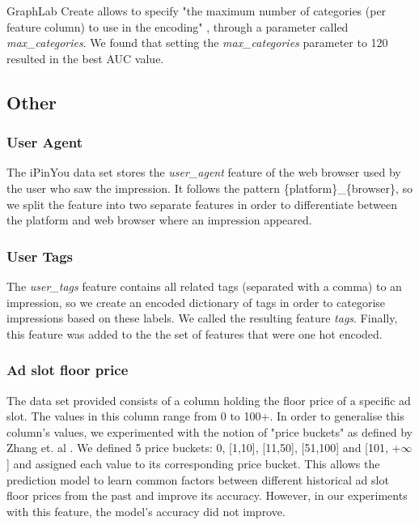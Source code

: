 \documentclass{article} %
\begin{document}
GraphLab Create \cite{graphlabcreate} allows to specify "the maximum number of categories (per feature column) to use in the encoding" \cite{graphlabcreate_onehotencoder}, through a parameter called \textit{max\_categories}. We found that setting the \textit{max\_categories} parameter to 120 resulted in the best AUC value.

\subsection{Other}

\subsubsection*{User Agent}

The iPinYou data set stores the \textit{user\_agent} feature of the web browser used by the user who saw the impression. It follows the pattern \{platform\}\_\{browser\}, so we split the feature into two separate features in order to differentiate between the platform and web browser where an impression appeared.

\subsubsection*{User Tags}

The \textit{user\_tags} feature contains all related tags (separated with a comma) to an impression, so we create an encoded dictionary of tags in order to categorise impressions based on these labels. We called the resulting feature \textit{tags}. Finally, this feature was added to the the set of features that were one hot encoded.

\subsubsection*{Ad slot floor price}

The data set provided consists of a column holding the floor price of a specific ad slot. The values in this column range from 0 to 100+. In order to generalise this column's values, we experimented with the notion of "price buckets" as defined by Zhang et. al \cite{zhang2014real}. We defined 5 price buckets: 0, [1,10], [11,50], [51,100] and [101, +$\infty$] and assigned each value to its corresponding price bucket. This allows the prediction model to learn common factors between different historical ad slot floor prices from the past and improve its accuracy. However, in our experiments with this feature, the model's accuracy did not improve.
\end{document}
